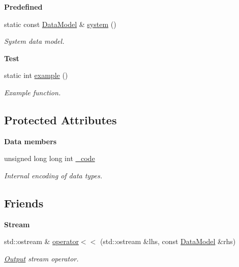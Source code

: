 \begin{Indent}{\bf Predefined}\par
\begin{DoxyCompactItemize}
\item 
static const \hyperlink{exceptionmagrathea_1_1DataModel}{Data\-Model} \& \hyperlink{exceptionmagrathea_1_1DataModel_afe0d6833ef51966156c9e60ee3feb6d3}{system} ()
\begin{DoxyCompactList}\small\item\em System data model. \end{DoxyCompactList}\end{DoxyCompactItemize}
\end{Indent}
\begin{Indent}{\bf Test}\par
\begin{DoxyCompactItemize}
\item 
static int \hyperlink{exceptionmagrathea_1_1DataModel_a0cb85bca28b5ff833a07650d79546e85}{example} ()
\begin{DoxyCompactList}\small\item\em Example function. \end{DoxyCompactList}\end{DoxyCompactItemize}
\end{Indent}
\subsection*{Protected Attributes}
\begin{Indent}{\bf Data members}\par
\begin{DoxyCompactItemize}
\item 
unsigned long long int \hyperlink{exceptionmagrathea_1_1DataModel_abfe65488bb9c1dd84a1fb3be5f10b3b2}{\-\_\-code}
\begin{DoxyCompactList}\small\item\em Internal encoding of data types. \end{DoxyCompactList}\end{DoxyCompactItemize}
\end{Indent}
\subsection*{Friends}
\begin{Indent}{\bf Stream}\par
\begin{DoxyCompactItemize}
\item 
std\-::ostream \& \hyperlink{exceptionmagrathea_1_1DataModel_a1047ea9e865adf05583b8da31fa6042d}{operator$<$$<$} (std\-::ostream \&lhs, const \hyperlink{exceptionmagrathea_1_1DataModel}{Data\-Model} \&rhs)
\begin{DoxyCompactList}\small\item\em \hyperlink{exceptionOutput}{Output} stream operator. \end{DoxyCompactList}\end{DoxyCompactItemize}
\end{Indent}


